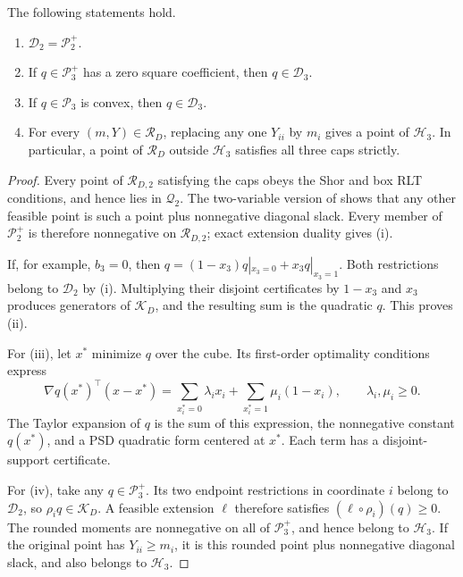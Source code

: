 \begin{corollary}\label{three:two-dimensional}
The following statements hold.
\begin{enumerate}[label=(\roman*)]
\item $\mathcal D_2=\mathcal P_2^+$.
\item If $q\in\mathcal P_3^+$ has a zero square coefficient, then
      $q\in \mathcal D_3$.
\item If $q\in\mathcal P_3$ is convex, then $q\in \mathcal D_3$.
\item For every $(m,Y)\in \mathcal R_D$, replacing any one $Y_{ii}$ by $m_i$
      gives a point of $\mathcal H_3$. In particular, a point of $\mathcal R_D$
      outside $\mathcal H_3$ satisfies all three caps strictly.
\end{enumerate}
\end{corollary}
\begin{proof}
Every point of $\mathcal R_{D,2}$ satisfying the caps obeys the Shor and box RLT
conditions, and hence lies in $\mathcal Q_2$. The two-variable version of
 shows that any other feasible point is such a point
plus nonnegative diagonal slack. Every member of $\mathcal P_2^+$ is
therefore nonnegative on $\mathcal R_{D,2}$; exact extension duality gives (i).

If, for example, $b_3=0$, then
$q=(1-x_3)q|_{x_3=0}+x_3q|_{x_3=1}$. Both restrictions belong to $\mathcal D_2$
by (i). Multiplying their disjoint certificates by $1-x_3$ and $x_3$
produces generators of $\mathcal K_D$, and the resulting sum is the quadratic $q$.
This proves (ii).

For (iii), let $x^*$ minimize $q$ over the cube. Its first-order
optimality conditions express
\[
 \nabla q(x^*)^\top(x-x^*)
  =\sum_{x_i^*=0}\lambda_i x_i+
    \sum_{x_i^*=1}\mu_i(1-x_i),\qquad\lambda_i,\mu_i\ge0.
\]
The Taylor expansion of $q$ is the sum of this expression, the nonnegative
constant $q(x^*)$, and a PSD quadratic form centered at $x^*$. Each term
has a disjoint-support certificate.

For (iv), take any $q\in\mathcal P_3^+$. Its two endpoint restrictions in
coordinate $i$ belong to $\mathcal D_2$, so $\rho_iq\in \mathcal K_D$. A feasible extension
$\ell$ therefore satisfies $(\ell\circ\rho_i)(q)\ge0$. The rounded moments
are nonnegative on all of $\mathcal P_3^+$, and hence belong to
$\mathcal H_3$. If the original point has $Y_{ii}\ge m_i$, it is this
rounded point plus nonnegative diagonal slack, and also belongs to
$\mathcal H_3$.
\end{proof}

